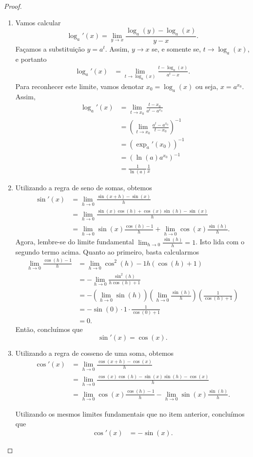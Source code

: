 \begin{proof}
\begin{enumerate}
		\item Vamos calcular
		\[\log_a'(x)=\lim_{y\to x}\frac{\log_a(y)-\log_a(x)}{y-x}.\]
		Façamos a substituição $y=a^t$. Assim, $y\to x$ se, e somente se, $t\to\log_a(x)$, e portanto
		\begin{align*}
			\log_a'(x)
				&=\lim_{t\to \log_a(x)}\frac{t-\log_a(x)}{a^t-x}.
		\end{align*}
		Para reconhecer este limite, vamos denotar $x_0=\log_a(x)$ ou seja, $x=a^{x_0}$. Assim,
		\begin{align*}
			\log_a'(x)
				&=\lim_{t\to x_0}\frac{t-x_0}{a^t-a^{x_0}}\\
				&=\left(\lim_{t\to x_0}\frac{a^t-a^{x_0}}{t-x_0}\right)^{-1}\\
				&=\left(\exp_a'(x_0)\right)^{-1}\\
				&=\left(\ln(a)a^{x_0}\right)^{-1}\\
				&=\frac{1}{\ln(a)}\frac{1}{x}
		\end{align*}
		
		\item Utilizando a regra de seno de somas, obtemos
		\begin{align*}
			\sin'(x)
				&=\lim_{h\to 0}\frac{\sin(x+h)-\sin(x)}{h}\\
				&=\lim_{h\to 0}\frac{\sin(x)\cos(h)+\cos(x)\sin(h)-\sin(x)}{h}\\
				&=\lim_{h\to 0}\sin(x)\frac{\cos(h)-1}{h}+\lim_{h\to 0}\cos(x)\frac{\sin(h)}{h}.
		\end{align*}
		Agora, lembre-se do limite fundamental $\lim_{h\to 0}\frac{\sin(h)}{h}=1$. Isto lida com o segundo termo acima. Quanto ao primeiro, basta calcularmos
		\begin{align*}
			\lim_{h\to 0}\frac{\cos(h)-1}{h}
				&=\lim_{h\to 0}{\cos^2(h)-1}{h(\cos(h)+1)}\\
				&=-\lim_{h\to 0}\frac{\sin^2(h)}{h\cos(h)+1}\\
				&=-\left(\lim_{h\to 0}\sin(h)\right)\left(\lim_{h\to 0}\frac{\sin(h)}{h}\right)\left(\frac{1}{\cos(h)+1}\right)\\
				&=-\sin(0)\cdot 1\cdot\frac{1}{\cos(0)+1}\\
				&=0.
		\end{align*}
		Então, concluímos que
		\[\sin'(x)=\cos(x).\]
		
		\item Utilizando a regra de cosseno de uma soma, obtemos
		\begin{align*}
			\cos'(x)
				&=\lim_{h\to 0}\frac{\cos(x+h)-\cos(x)}{h}\\
				&=\lim_{h\to 0}\frac{\cos(x)\cos(h)-\sin(x)\sin(h)-\cos(x)}{h}\\
				&=\lim_{h\to 0}\cos(x)\frac{\cos(h)-1}{h}-\lim_{h\to 0}\sin(x)\frac{\sin(h)}{h}.
		\end{align*}
		
		Utilizando os mesmos limites fundamentais que no item anterior, concluímos que
		\begin{align*}
			\cos'(x)&=-\sin(x).
		\end{align*}
	\end{enumerate}
		
\end{proof}